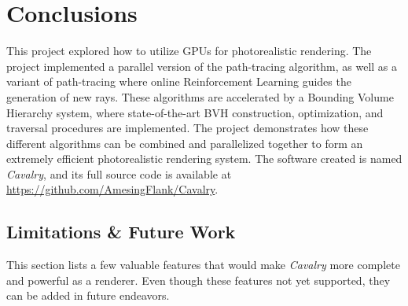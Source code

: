 \chapter{Conclusions}

This project explored how to utilize GPUs for photorealistic rendering. The project implemented a parallel version of the path-tracing algorithm, as well as a variant of path-tracing where online Reinforcement Learning guides the generation of new rays. These algorithms are accelerated by a Bounding Volume Hierarchy system, where state-of-the-art BVH construction, optimization, and traversal procedures are implemented. The project demonstrates how these different algorithms can be combined and parallelized together to form an extremely efficient photorealistic rendering system. The software created is named \textit{Cavalry}, and its full source code is available at \url{https://github.com/AmesingFlank/Cavalry}.

\section{Limitations \& Future Work}
\label{section limitations}
This section lists a few valuable features that would make \textit{Cavalry} more complete and powerful as a renderer. Even though these features not yet supported, they can be added in future endeavors.


